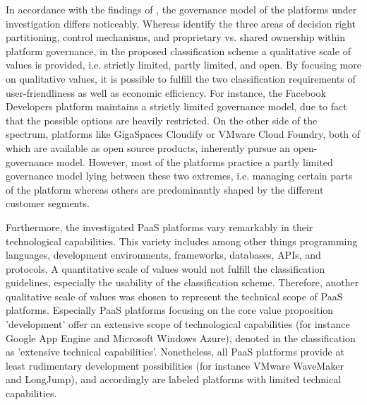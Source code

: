 In accordance with the findings of \citet{Tiwana2010}, the governance model of the platforms under investigation differs noticeably. Whereas \citet[pp. 679-681]{Tiwana2010} identify the three areas of decision right partitioning, control mechanisms, and proprietary vs. shared ownership within platform governance, in the proposed classification scheme a qualitative scale of values is provided, i.e. strictly limited, partly limited, and open. By focusing more on qualitative values, it is possible to fulfill the two classification requirements of user-friendliness as well as economic efficiency. For instance, the Facebook Developers platform maintains a strictly limited governance model, due to fact that the possible options are heavily restricted. On the other side of the spectrum, platforms like GigaSpaces Cloudify or VMware Cloud Foundry, both of which are available as open source products, inherently pursue an open-governance model. However, most of the platforms practice a partly limited governance model lying between these two extremes, i.e. managing certain parts of the platform whereas others are predominantly shaped by the different customer segments.

Furthermore, the investigated \ac{PaaS} platforms vary remarkably in their technological capabilities. This variety includes among other things programming languages, development environments, frameworks, databases, \acp{API}, and protocols. A quantitative scale of values would not fulfill the classification guidelines, especially the usability of the classification scheme. Therefore, another qualitative scale of values was chosen to represent the technical scope of \ac{PaaS} platforms. Especially \ac{PaaS} platforms focusing on the core value proposition 'development' offer an extensive scope of technological capabilities (for instance Google App Engine and Microsoft Windows Azure), denoted in the classification as 'extensive technical capabilities'. Nonetheless, all \ac{PaaS} platforms provide at least rudimentary development possibilities (for instance VMware WaveMaker and LongJump), and accordingly are labeled platforms with limited technical capabilities.

